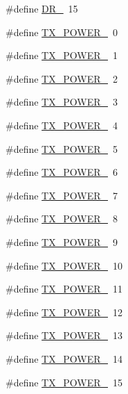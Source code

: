 \begin{DoxyCompactItemize}
$$\item 
\#define \mbox{\hyperlink{group___r_e_g_i_o_n_gac6e078f51b71f05093daf27834997396}{D\+R\+\_}}~15
\item 
\#define \mbox{\hyperlink{group___r_e_g_i_o_n_gab33618449f2a573142c463ab071ef8ed}{T\+X\+\_\+\+P\+O\+W\+E\+R\+\_}}~0
\item 
\#define \mbox{\hyperlink{group___r_e_g_i_o_n_gaac7fe73d03d0e880cc4c7a3d30e23cb6}{T\+X\+\_\+\+P\+O\+W\+E\+R\+\_}}~1
\item 
\#define \mbox{\hyperlink{group___r_e_g_i_o_n_gaf308ada92d6393ca5ae171ffc462c74c}{T\+X\+\_\+\+P\+O\+W\+E\+R\+\_}}~2
\item 
\#define \mbox{\hyperlink{group___r_e_g_i_o_n_ga9d5bc42aaace47b7053ecf685153bdaa}{T\+X\+\_\+\+P\+O\+W\+E\+R\+\_}}~3
\item 
\#define \mbox{\hyperlink{group___r_e_g_i_o_n_ga36456baf8ace3e7d7ae730ddb54b95bc}{T\+X\+\_\+\+P\+O\+W\+E\+R\+\_}}~4
\item 
\#define \mbox{\hyperlink{group___r_e_g_i_o_n_ga0149d52581db80901b5bc1adf0aedd1d}{T\+X\+\_\+\+P\+O\+W\+E\+R\+\_}}~5
\item 
\#define \mbox{\hyperlink{group___r_e_g_i_o_n_ga29743296a1bb29534ecc4894967c0714}{T\+X\+\_\+\+P\+O\+W\+E\+R\+\_}}~6
\item 
\#define \mbox{\hyperlink{group___r_e_g_i_o_n_ga3c7bd9a98f0c1e7e9aaa90857c4bd700}{T\+X\+\_\+\+P\+O\+W\+E\+R\+\_}}~7
\item 
\#define \mbox{\hyperlink{group___r_e_g_i_o_n_ga99ec65aa5375a9dbbaf2faac8d7f6968}{T\+X\+\_\+\+P\+O\+W\+E\+R\+\_}}~8
\item 
\#define \mbox{\hyperlink{group___r_e_g_i_o_n_gacf5b8e09a82ae407ae0ab2d81f1e0c3d}{T\+X\+\_\+\+P\+O\+W\+E\+R\+\_}}~9
\item 
\#define \mbox{\hyperlink{group___r_e_g_i_o_n_gac9747c69350f34d485c3134e5a57655b}{T\+X\+\_\+\+P\+O\+W\+E\+R\+\_}}~10
\item 
\#define \mbox{\hyperlink{group___r_e_g_i_o_n_ga739bc82fae779702381bcaa5e85d7d06}{T\+X\+\_\+\+P\+O\+W\+E\+R\+\_}}~11
\item 
\#define \mbox{\hyperlink{group___r_e_g_i_o_n_gaeeb1b0e98ed14b98b55ce8b7fbd8d3f1}{T\+X\+\_\+\+P\+O\+W\+E\+R\+\_}}~12
\item 
\#define \mbox{\hyperlink{group___r_e_g_i_o_n_gaabaceca100173cd1f450f53d2e14f0a2}{T\+X\+\_\+\+P\+O\+W\+E\+R\+\_}}~13
\item 
\#define \mbox{\hyperlink{group___r_e_g_i_o_n_ga6932af7382128090be2a6533e260dd9c}{T\+X\+\_\+\+P\+O\+W\+E\+R\+\_}}~14
\item 
\#define \mbox{\hyperlink{group___r_e_g_i_o_n_gabe4f87ed0aa6efe21ec76d9a32a334ef}{T\+X\+\_\+\+P\+O\+W\+E\+R\+\_}}~15
\end{DoxyCompactItemize}
